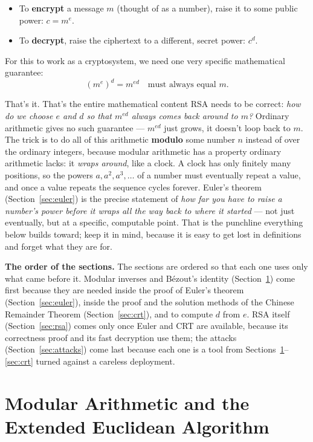 \documentclass[11pt]{article}
\theoremstyle{definition}
\theoremstyle{remark}
\begin{document}
\begin{itemize}
\item To \textbf{encrypt} a message $m$ (thought of as a number), raise it to some public power: $c = m^e$.
\item To \textbf{decrypt}, raise the ciphertext to a different, secret power: $c^d$.
\end{itemize}

For this to work as a cryptosystem, we need one very specific mathematical guarantee:
\[
(m^e)^d = m^{ed} \quad \text{must always equal } m.
\]

That's it. That's the entire mathematical content RSA needs to be correct: \emph{how do we choose $e$ and $d$ so that $m^{ed}$ always comes back around to $m$?} Ordinary arithmetic gives no such guarantee --- $m^{ed}$ just grows, it doesn't loop back to $m$. The trick is to do all of this arithmetic \textbf{modulo} some number $n$ instead of over the ordinary integers, because modular arithmetic has a property ordinary arithmetic lacks: it \emph{wraps around}, like a clock. A clock has only finitely many positions, so the powers $a, a^2, a^3,\dots$ of a number must eventually repeat a value, and once a value repeats the sequence cycles forever. Euler's theorem (Section~\ref{sec:euler}) is the precise statement of \emph{how far you have to raise a number's power before it wraps all the way back to where it started} --- not just eventually, but at a specific, computable point. That is the punchline everything below builds toward; keep it in mind, because it is easy to get lost in definitions and forget what they are for.

\textbf{The order of the sections.} The sections are ordered so that each one uses only what came before it. Modular inverses and B\'ezout's identity (Section~\ref{sec:eea}) come first because they are needed inside the proof of Euler's theorem (Section~\ref{sec:euler}), inside the proof and the solution methods of the Chinese Remainder Theorem (Section~\ref{sec:crt}), and to compute $d$ from $e$. RSA itself (Section~\ref{sec:rsa}) comes only once Euler and CRT are available, because its correctness proof and its fast decryption use them; the attacks (Section~\ref{sec:attacks}) come last because each one is a tool from Sections~\ref{sec:eea}--\ref{sec:crt} turned against a careless deployment.


\newpage
\section{Modular Arithmetic and the Extended Euclidean Algorithm}\label{sec:eea}
\end{document}
